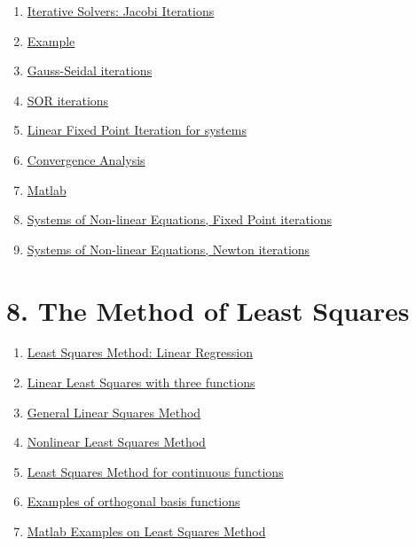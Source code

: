 \documentclass[11pt]{article}
\begin{document}
\begin{multicols}{2}
	\begin{enumerate}
		\item \href{https://mp.weixin.qq.com/s/svbd9RpB8fl26FuIunXtPA}{Iterative Solvers: Jacobi Iterations}	%
		\item \href{https://mp.weixin.qq.com/s/3a-ppJKyB8SzioYF7DVsWQ}{Example}	%
		\item \href{https://mp.weixin.qq.com/s/4z5IDIaFvsZRnA3pOP6EGA}{Gauss-Seidal iterations}	%
		\item \href{https://mp.weixin.qq.com/s/nD_8BHYLl6-1rpTvGOMjmw}{SOR iterations}	%
		\item \href{https://mp.weixin.qq.com/s/XTJHqi26WIYJTYxJCT9EWA}{Linear Fixed Point Iteration for systems}	%
		\item \href{https://mp.weixin.qq.com/s/A75sYJaEJRkahnw0Z-uwnA}{Convergence Analysis}	%
		\item \href{https://mp.weixin.qq.com/s/wwOVdVvId5faciM8pdKaDg}{Matlab}	%
		\item \href{https://mp.weixin.qq.com/s/wMT0eHEjKI7soRb0QPXo3A}{Systems of Non-linear Equations, Fixed Point iterations}	%
		\item \href{https://mp.weixin.qq.com/s/Ermc6MMpN3loAUBOLWnJuA}{Systems of Non-linear Equations, Newton iterations}	%
	\end{enumerate}
\end{multicols}

\vspace{-1cm}

\section*{8. The Method of Least Squares}

\vspace{-0.5cm}

\begin{multicols}{2}
	\begin{enumerate}
		\item \href{https://mp.weixin.qq.com/s/3PQaIc9mpxbaWeGLWRzXDg}{Least Squares Method: Linear Regression}	%
		\item \href{https://mp.weixin.qq.com/s/0uE2K6WzW8zt5Oz-1jlSvA}{Linear Least Squares with three functions}	%
		\item \href{https://mp.weixin.qq.com/s/z1CLA5QYT2zhR1wUizg1Eg}{General Linear Squares Method}	%
		\item \href{https://mp.weixin.qq.com/s/VzQYg4ogJSljxvyGjp_Drw}{Nonlinear Least Squares Method}	%
		\item \href{https://mp.weixin.qq.com/s/e09xN6GGu37ZJvPHRsm8Tw}{Least Squares Method for continuous functions}	%
		\item \href{https://mp.weixin.qq.com/s/Uph6THvP0ZLu99ZvhtZ8YQ}{Examples of orthogonal basis functions}	%
		\item \href{https://mp.weixin.qq.com/s/uAKAPJHYUyojZdPfAVuorw}{Matlab Examples on Least Squares Method}	%
	\end{enumerate}
\end{multicols}
\end{document}
